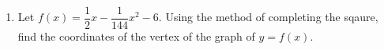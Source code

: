 \documentclass[11pt]{article}
\begin{document}
    \begin{enumerate}
        \item Let $f(x)=\dfrac{1}{2}x-\dfrac{1}{144}x^2-6$. Using the method of completing the sqaure, find the coordinates of the vertex of the graph of $y=f(x)$.
        
            \hrulefill
                
            \hrulefill
            
            \hrulefill
        
            \hrulefill
            
            \hrulefill
                
            \hrulefill
            
            \hrulefill
                
            \hrulefill
            
            \hrulefill
            
            \hrulefill
            
            \hrulefill
            
            \hrulefill
            
            \hrulefill
            
            \hrulefill
            
            \hrulefill
            
            \hrulefill
            
            \hrulefill
            
            \hrulefill
            
            \hrulefill
            
            \hrulefill
            
            \hrulefill
            
            \hrulefill
            
            \hrulefill
            
            \hrulefill
            
            \hrulefill
            
            \hrulefill
            
            \hrulefill
            
            \hrulefill
            
            \hrulefill


\end{enumerate}
\end{document}
